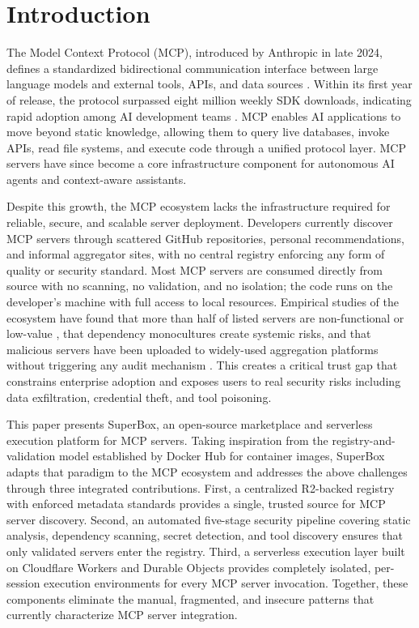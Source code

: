 \documentclass[conference]{IEEEtran}
\begin{document}
\section{Introduction}
\label{sec:intro}

The Model Context Protocol (MCP), introduced by Anthropic in late 2024,
defines a standardized bidirectional communication interface between
large language models and external tools, APIs, and data sources
\cite{anthropic2024}.
Within its first year of release, the protocol surpassed eight million
weekly SDK downloads, indicating rapid adoption among AI
development teams \cite{hou2025}.
MCP enables AI applications to move beyond static knowledge,
allowing them to query live databases, invoke APIs, read file systems,
and execute code through a unified protocol layer.
MCP servers have since become a core infrastructure component for
autonomous AI agents and context-aware assistants.

Despite this growth, the MCP ecosystem lacks the infrastructure required
for reliable, secure, and scalable server deployment.
Developers currently discover MCP servers through scattered GitHub
repositories, personal recommendations, and informal aggregator sites,
with no central registry enforcing any form of quality or security
standard.
Most MCP servers are consumed directly from source with no scanning,
no validation, and no isolation; the code runs on the developer's
machine with full access to local resources.
Empirical studies of the ecosystem have found that more than half of
listed servers are non-functional or low-value \cite{guo2025},
that dependency monocultures create systemic risks,
and that malicious servers have been uploaded to widely-used aggregation
platforms without triggering any audit mechanism \cite{song2025}.
This creates a critical trust gap that constrains enterprise adoption
and exposes users to real security risks including data exfiltration,
credential theft, and tool poisoning.

This paper presents SuperBox, an open-source marketplace and serverless
execution platform for MCP servers.
Taking inspiration from the registry-and-validation model established
by Docker Hub for container images, SuperBox adapts that paradigm to
the MCP ecosystem and addresses the above challenges through three
integrated contributions.
First, a centralized R2-backed registry with enforced metadata standards
provides a single, trusted source for MCP server discovery.
Second, an automated five-stage security pipeline covering static
analysis, dependency scanning, secret detection, and tool discovery
ensures that only validated servers enter the registry.
Third, a serverless execution layer built on Cloudflare Workers and
Durable Objects provides completely isolated, per-session execution
environments for every MCP server invocation.
Together, these components eliminate the manual, fragmented, and
insecure patterns that currently characterize MCP server integration.
\end{document}

